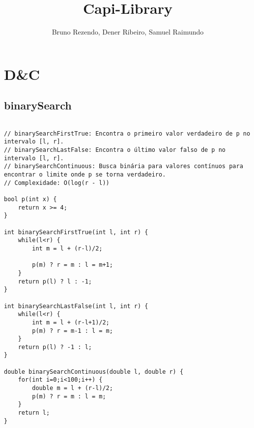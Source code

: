 \documentclass[landscape,twocolumn,10pt,a4paper]{article}
\title{Capi-Library
}
\author{Bruno Rezendo, Dener Ribeiro, Samuel Raimundo}
\begin{document}
\maketitle

\tableofcontents\section{D&C}
\subsection{binarySearch}
\begin{verbatim}

// binarySearchFirstTrue: Encontra o primeiro valor verdadeiro de p no intervalo [l, r].
// binarySearchLastFalse: Encontra o último valor falso de p no intervalo [l, r].
// binarySearchContinuous: Busca binária para valores contínuos para encontrar o limite onde p se torna verdadeiro.
// Complexidade: O(log(r - l))

bool p(int x) {
    return x >= 4;
}

int binarySearchFirstTrue(int l, int r) {
    while(l<r) {
        int m = l + (r-l)/2;

        p(m) ? r = m : l = m+1;
    }
    return p(l) ? l : -1;
}

int binarySearchLastFalse(int l, int r) {
    while(l<r) {
        int m = l + (r-l+1)/2;
        p(m) ? r = m-1 : l = m;
    }
    return p(l) ? -1 : l;
}

double binarySearchContinuous(double l, double r) {
    for(int i=0;i<100;i++) {
        double m = l + (r-l)/2;
        p(m) ? r = m : l = m;
    }
    return l; 
}


\end{verbatim}
\end{document}
